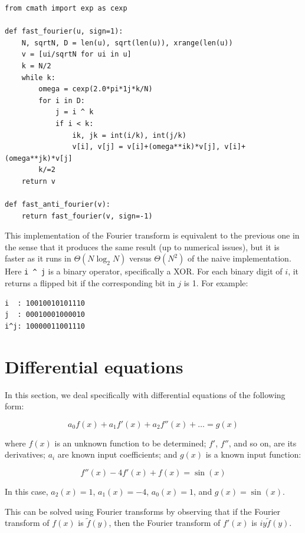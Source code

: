 \documentclass[justified,sixbynine]{tufte-book}
\theoremstyle{plain}%
\theoremstyle{definition}
\theoremstyle{remark}
\begin{document}
\begin{fullwidth}
\begin{lstlisting}
from cmath import exp as cexp

def fast_fourier(u, sign=1):
    N, sqrtN, D = len(u), sqrt(len(u)), xrange(len(u))
    v = [ui/sqrtN for ui in u]
    k = N/2
    while k:
        omega = cexp(2.0*pi*1j*k/N)
        for i in D:
            j = i ^ k
            if i < k:
                ik, jk = int(i/k), int(j/k)
                v[i], v[j] = v[i]+(omega**ik)*v[j], v[i]+(omega**jk)*v[j]
        k/=2
    return v

def fast_anti_fourier(v):
    return fast_fourier(v, sign=-1)
\end{lstlisting}

This implementation of the Fourier transform is equivalent to the previous one in the sense that it produces the same result (up to numerical issues), but it is faster as it runs in $\Theta(N \log_2 N)$ versus $\Theta(N^2)$ of the naive implementation. Here \verb!i ^ j!
is a binary operator, specifically a XOR. For each binary digit of $i$, it returns a flipped bit if the corresponding bit in $j$ is 1. For example:

\begin{lstlisting}
i  : 10010010101110
j  : 00010001000010
i^j: 10000011001110
\end{lstlisting}

\section{Differential equations}

In this section, we deal specifically with differential equations of the following form:

\begin{equation}
a_0 f(x) + a_1 f'(x) + a_2 f''(x) + \dots = g(x) \label{diffeq}
\end{equation}

where $f(x)$ is an unknown function to be determined; $f'$, $f''$, and so on, are its derivatives; $a_i$ are known input coefficients; and $g(x)$ is a known input function:

\begin{equation}
f''(x) - 4 f'(x) + f(x) = \sin(x)
\end{equation}

In this case, $a_2(x) = 1$, $a_1(x) = -4$, $a_0(x) = 1$, and $g(x) = \sin(x)$.

This can be solved using Fourier transforms by observing that if the Fourier transform of $f(x)$ is $\tilde f(y)$, then the Fourier transform of $f'(x)$ is $iy\tilde f(y)$.


\end{fullwidth}
\end{document}
